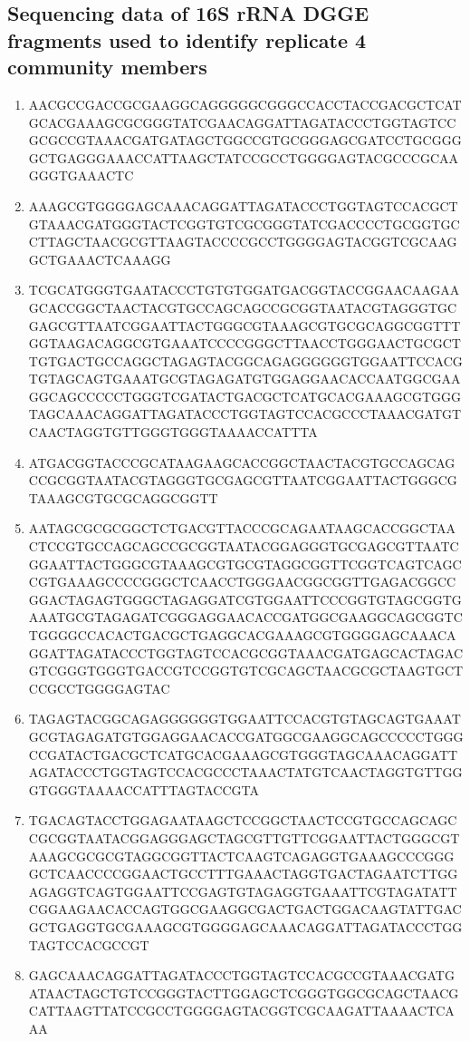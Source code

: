 \documentclass{article}
\begin{document}
\subsection{Sequencing data of 16S rRNA DGGE fragments used to identify replicate 4 community members}
\begin{enumerate}
\item AACGCCGACCGCGAAGGCAGGGGGCGGGCCACCTACCGACGCTCATGCACGAAAGCGCGGGTATCGAACAGGATTAGATACCCTGGTAGTCCGCGCCGTAAACGATGATAGCTGGCCGTGCGGGAGCGATCCTGCGGGGCTGAGGGAAACCATTAAGCTATCCGCCTGGGGAGTACGCCCGCAAGGGTGAAACTC
\item AAAGCGTGGGGAGCAAACAGGATTAGATACCCTGGTAGTCCACGCTGTAAACGATGGGTACTCGGTGTCGCGGGTATCGACCCCTGCGGTGCCTTAGCTAACGCGTTAAGTACCCCGCCTGGGGAGTACGGTCGCAAGGCTGAAACTCAAAGG
\item TCGCATGGGTGAATACCCTGTGTGGATGACGGTACCGGAACAAGAAGCACCGGCTAACTACGTGCCAGCAGCCGCGGTAATACGTAGGGTGCGAGCGTTAATCGGAATTACTGGGCGTAAAGCGTGCGCAGGCGGTTTGGTAAGACAGGCGTGAAATCCCCGGGCTTAACCTGGGAACTGCGCTTGTGACTGCCAGGCTAGAGTACGGCAGAGGGGGGTGGAATTCCACGTGTAGCAGTGAAATGCGTAGAGATGTGGAGGAACACCAATGGCGAAGGCAGCCCCCTGGGTCGATACTGACGCTCATGCACGAAAGCGTGGGTAGCAAACAGGATTAGATACCCTGGTAGTCCACGCCCTAAACGATGTCAACTAGGTGTTGGGTGGGTAAAACCATTTA
\item ATGACGGTACCCGCATAAGAAGCACCGGCTAACTACGTGCCAGCAGCCGCGGTAATACGTAGGGTGCGAGCGTTAATCGGAATTACTGGGCGTAAAGCGTGCGCAGGCGGTT
\item AATAGCGCGCGGCTCTGACGTTACCCGCAGAATAAGCACCGGCTAACTCCGTGCCAGCAGCCGCGGTAATACGGAGGGTGCGAGCGTTAATCGGAATTACTGGGCGTAAAGCGTGCGTAGGCGGTTCGGTCAGTCAGCCGTGAAAGCCCCGGGCTCAACCTGGGAACGGCGGTTGAGACGGCCGGACTAGAGTGGGCTAGAGGATCGTGGAATTCCCGGTGTAGCGGTGAAATGCGTAGAGATCGGGAGGAACACCGATGGCGAAGGCAGCGGTCTGGGGCCACACTGACGCTGAGGCACGAAAGCGTGGGGAGCAAACAGGATTAGATACCCTGGTAGTCCACGCGGTAAACGATGAGCACTAGACGTCGGGTGGGTGACCGTCCGGTGTCGCAGCTAACGCGCTAAGTGCTCCGCCTGGGGAGTAC
\item TAGAGTACGGCAGAGGGGGGTGGAATTCCACGTGTAGCAGTGAAATGCGTAGAGATGTGGAGGAACACCGATGGCGAAGGCAGCCCCCTGGGCCGATACTGACGCTCATGCACGAAAGCGTGGGTAGCAAACAGGATTAGATACCCTGGTAGTCCACGCCCTAAACTATGTCAACTAGGTGTTGGGTGGGTAAAACCATTTAGTACCGTA
\item TGACAGTACCTGGAGAATAAGCTCCGGCTAACTCCGTGCCAGCAGCCGCGGTAATACGGAGGGAGCTAGCGTTGTTCGGAATTACTGGGCGTAAAGCGCGCGTAGGCGGTTACTCAAGTCAGAGGTGAAAGCCCGGGGCTCAACCCCGGAACTGCCTTTGAAACTAGGTGACTAGAATCTTGGAGAGGTCAGTGGAATTCCGAGTGTAGAGGTGAAATTCGTAGATATTCGGAAGAACACCAGTGGCGAAGGCGACTGACTGGACAAGTATTGACGCTGAGGTGCGAAAGCGTGGGGAGCAAACAGGATTAGATACCCTGGTAGTCCACGCCGT
\item GAGCAAACAGGATTAGATACCCTGGTAGTCCACGCCGTAAACGATGATAACTAGCTGTCCGGGTACTTGGAGCTCGGGTGGCGCAGCTAACGCATTAAGTTATCCGCCTGGGGAGTACGGTCGCAAGATTAAAACTCAAA

\end{enumerate}
\end{document}
